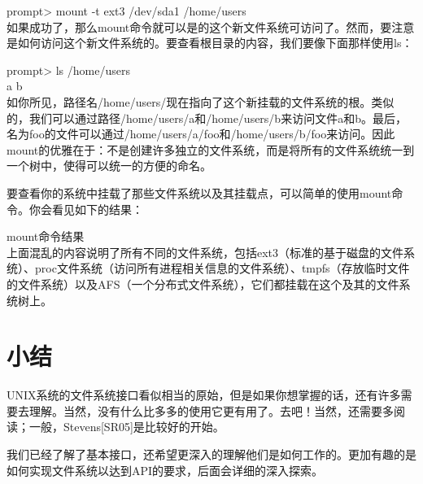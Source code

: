 prompt> mount -t ext3 /dev/sda1 /home/users\\

如果成功了，那么mount命令就可以是的这个新文件系统可访问了。然而，要注意是如何访问这个新文件系统的。要查看根目录的内容，我们要像下面那样使用ls：

prompt> ls /home/users\\
a b\\

如你所见，路径名/home/users/现在指向了这个新挂载的文件系统的根。类似的，我们可以通过路径/home/users/a和/home/users/b来访问文件a和b。最后，名为foo的文件可以通过/home/users/a/foo和/home/users/b/foo来访问。因此mount的优雅在于：不是创建许多独立的文件系统，而是将所有的文件系统统一到一个树中，使得可以统一的方便的命名。

要查看你的系统中挂载了那些文件系统以及其挂载点，可以简单的使用mount命令。你会看见如下的结果：

mount命令结果\\

上面混乱的内容说明了所有不同的文件系统，包括ext3（标准的基于磁盘的文件系统）、proc文件系统（访问所有进程相关信息的文件系统）、tmpfs（存放临时文件的文件系统）以及AFS（一个分布式文件系统），它们都挂载在这个及其的文件系统树上。


\section{小结}

UNIX系统的文件系统接口看似相当的原始，但是如果你想掌握的话，还有许多需要去理解。当然，没有什么比多多的使用它更有用了。去吧！当然，还需要多阅读；一般，Stevens[SR05]是比较好的开始。

我们已经了解了基本接口，还希望更深入的理解他们是如何工作的。更加有趣的是如何实现文件系统以达到API的要求，后面会详细的深入探索。

















